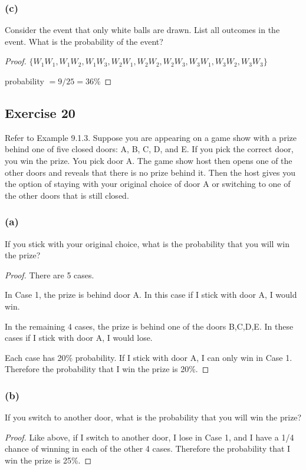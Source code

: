 \documentclass[14pt]{extarticle}
\begin{document}
\subsubsection{(c)}
Consider the event that only white balls are drawn. List all outcomes in the event. 
What is the probability of the event?

\begin{proof}
\(\{W_1W_1, W_1W_2, W_1W_3, W_2W_1, W_2W_2, W_2W_3, W_3W_1, W_3W_2, W_3W_3\}\)

probability \(= 9/25 = 36\%\)
\end{proof}

\subsection{Exercise 20}
Refer to Example 9.1.3. Suppose you are appearing on a game show with a prize behind one of five closed doors: A, B, C, 
D, and E. If you pick the correct door, you win the prize. You pick door A. The game show host then opens one of the 
other doors and reveals that there is no prize behind it. Then the host gives you the option of staying with your 
original choice of door A or switching to one of the other doors that is still closed.

\subsubsection{(a)}
If you stick with your original choice, what is the probability that you will win the prize?

\begin{proof}
There are 5 cases. 

In Case 1, the prize is behind door A. In this case if I stick with door A, I would win.

In the remaining 4 cases, the prize is behind one of the doors B,C,D,E. In these cases if I stick with door A, I 
would lose. 

Each case has 20\% probability. If I stick with door A, I can only win in Case 1. Therefore the probability that I 
win the prize is 20\%.
\end{proof}

\subsubsection{(b)}
If you switch to another door, what is the probability that you will win the prize?

\begin{proof}
Like above, if I switch to another door, I lose in Case 1, and I have a 1/4 chance of winning in each of the other 4 
cases. Therefore the probability that I win the prize is 25\%.
\end{proof}
\end{document}
